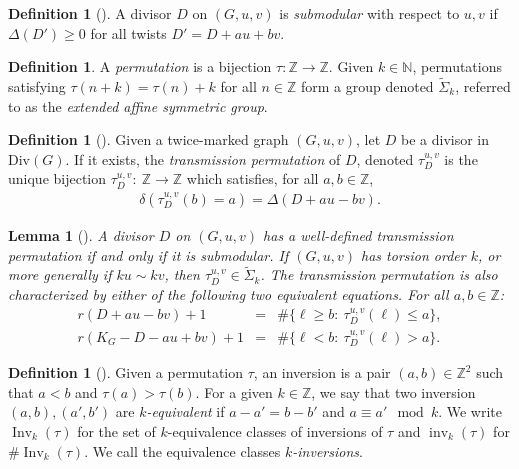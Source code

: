 \documentclass[11pt]{article}
\newtheorem{lemma}[theo]{Lemma}
\theoremstyle{definition}
\newtheorem{defi}[theo]{Definition}
\numberwithin{equation}{section}
\newcommand{\N}{\mathbb{N}}
\newcommand{\Z}{\mathbb{Z}}
\newcommand{\opdiv}[1]{\mathrm{Div}\left({#1}\right)}
\newcommand{\Inv}{\operatorname{Inv}}
\newcommand{\inv}{\operatorname{inv}}
\newcommand{\eaf}[1]{\widetilde{\Sigma}_{#1}}
\newcommand{\tauD}{\tau^{u,v}_D}
\begin{document}
\begin{defi}[\cite{Pfl22}]\label{def-submod}
A divisor $D$ on $(G,u,v)$ is \textit{submodular} with respect to $u,v$ if $\Delta(D')\geq 0$ for all twists $D' = D+au + bv$.
\end{defi}

\begin{defi}\label{def-EA}
    A \textit{permutation} is a bijection $\tau:\Z\to \Z$. Given $k\in \N$, permutations satisfying $\tau(n+k)= \tau(n) + k$ for all $n \in \Z$ form a group denoted $\eaf{k}$, referred to as the \textit{extended affine symmetric group}.
\end{defi}

\begin{defi}[\cite{Pfl22}]\label{def-tauD}
    Given a twice-marked graph $(G,u,v)$, let $D$ be a divisor in $\opdiv{G}$. If it exists, the \emph{transmission permutation} of $D$, denoted $\tauD$ is the unique bijection $\tauD:\ \Z \to \Z$ which satisfies, for all $a,b \in \Z$,
    \begin{align*}
        \delta(\tauD(b) = a) = \Delta(D+au-bv).
    \end{align*}
\end{defi}

\begin{lemma}[{\cite[Remark 1.5, Proposition 2.3]{Pfl22}}] \label{lem:tauChars} 
A divisor $D$ on $(G,u,v)$ has a well-defined transmission permutation if and only if it is submodular. If $(G,u,v)$ has torsion order $k$, or more generally if $ku \sim k v$, then $\tauD \in \eaf{k}$. The transmission permutation is also characterized by either of the following two equivalent equations. For all $a,b \in \Z$:
\begin{eqnarray*}
r(D + au - bv) + 1 &=& \# \{ \ell \geq b:\ \tauD(\ell) \leq a \},\\
r(K_G - D - au + bv) + 1 &=& \# \{ \ell < b:\ \tauD(\ell) >a \}.
\end{eqnarray*}
\end{lemma}

\begin{defi}[\cite{Pfl22}]\label{def-inv}
    Given a permutation $\tau$, an inversion is a pair $(a,b) \in \Z^2$ such that $a<b$ and $\tau(a)>\tau(b)$. For a given $k \in \Z$, we say that two inversion $(a,b),(a',b')$ are $k$\textit{-equivalent} if $a-a' = b-b'$ and $a \equiv a' \mod k$. We write $\Inv_k(\tau)$ for the set of $k$-equivalence classes of inversions of $\tau$ and $\inv_k(\tau)$ for $\# \Inv_k(\tau)$. We call the equivalence classes \textit{$k$-inversions}.
\end{defi}
\end{document}
